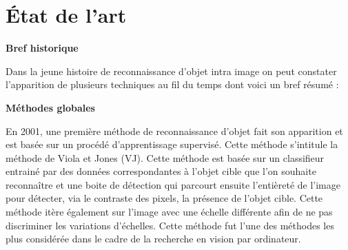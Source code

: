 \documentclass[a4paper,12pt]{article} %
\begin{document}
\section{État de l'art} %
\textbf{Bref historique}\newline
\par
	Dans la jeune histoire de reconnaissance d’objet intra image on peut constater l’apparition de plusieurs techniques au fil du temps dont voici un bref résumé :\newline

\textbf{Méthodes globales}\newline
\par
	En 2001, une première méthode de reconnaissance d’objet fait son apparition et est basée sur un procédé d’apprentissage supervisé. Cette méthode s’intitule la méthode de Viola et Jones (VJ). Cette méthode est basée sur un classifieur entrainé par des données correspondantes à l’objet cible que l’on souhaite reconnaître et une boite de détection  qui parcourt ensuite l’entièreté de l’image pour détecter, via le contraste des pixels, la présence de l’objet cible. Cette méthode itère également sur l’image avec une échelle différente afin de ne pas discriminer les variations d’échelles. Cette méthode fut l’une des méthodes les plus considérée dans le cadre de la recherche en vision par ordinateur.\newline
\end{document}
